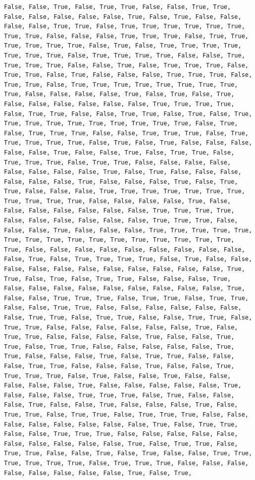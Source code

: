 \documentclass[
  letterpaper,
  DIV=11,
  numbers=noendperiod]{scrartcl}
\begin{document}
\begin{verbatim}
False, False, True, False, True, True, False, False, True, True, False, False, False, False, False, True, False, True, False, False, False, False, True, True, False, True, True, True, True, True, True, True, True, False, False, False, True, True, True, False, True, True, True, True, True, True, False, True, False, True, True, True, True, True, True, True, False, True, True, True, True, False, False, True, True, True, True, False, False, True, False, True, True, True, False, True, True, False, True, False, False, False, True, True, True, False, True, True, False, True, True, True, True, True, True, True, True, True, False, False, False, False, True, False, True, False, True, False, False, False, False, False, False, True, True, True, True, False, True, True, False, False, True, True, False, True, False, True, True, True, True, True, True, True, True, True, True, False, True, False, True, True, True, False, False, True, True, True, False, True, True, True, True, True, False, True, False, True, False, False, False, False, False, True, False, False, True, False, True, True, False, True, True, True, False, True, True, False, False, False, False, False, False, False, False, True, False, True, False, False, False, False, False, False, True, False, False, False, True, False, True, True, False, False, False, True, True, True, True, True, True, True, True, True, True, True, False, False, False, False, True, False, False, False, False, False, False, False, True, True, True, True, False, False, False, False, False, False, True, True, True, False, False, False, True, False, False, False, True, True, True, True, True, True, True, True, True, True, True, True, True, True, True, True, True, False, False, False, False, False, False, False, False, False, False, True, False, True, True, True, True, False, True, False, False, False, False, False, False, False, False, False, False, False, True, True, False, True, False, True, True, False, False, False, True, False, False, False, False, False, False, False, False, False, True, False, False, True, True, True, False, True, True, False, True, True, False, False, True, True, False, False, False, False, False, False, False, True, True, False, True, True, False, False, True, True, False, True, True, False, False, False, False, False, False, True, False, True, True, False, False, False, False, True, False, False, True, True, False, True, True, False, False, False, False, False, True, True, False, False, False, True, False, True, True, False, False, False, True, True, False, False, False, True, False, False, True, True, True, True, False, True, False, False, True, False, False, False, False, False, True, False, False, False, False, False, True, False, False, False, True, True, True, False, True, False, False, False, True, False, False, True, False, False, False, True, False, True, True, False, True, True, False, True, True, True, False, False, False, False, False, False, False, False, True, False, True, True, False, False, True, True, True, False, False, False, False, False, False, False, False, False, False, True, False, True, True, False, True, True, False, False, True, False, True, False, False, True, True, True, True, True, True, False, True, True, True, False, False, False, False, False, False, False, False, True, False, True, 
\end{verbatim}
\end{document}
